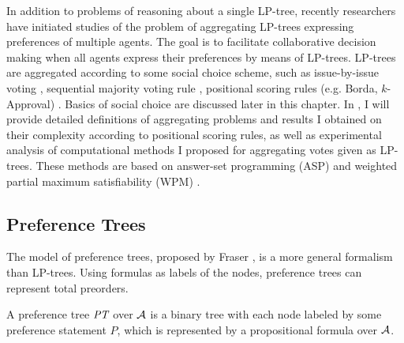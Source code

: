 %
%	  
%	

In addition to problems of reasoning about a single
LP-tree, recently researchers have initiated studies of
the problem of aggregating LP-trees expressing preferences of multiple
agents. The goal is to facilitate collaborative decision making
when all agents express their preferences by means of LP-trees.
LP-trees are aggregated
according to some social choice scheme, such as
issue-by-issue voting \cite{fargier:ibi},
sequential majority voting rule \cite{Xia:SMV},
positional scoring rules (e.g. Borda, $k$-Approval) \cite{lang,LiuT}.
Basics of social choice are discussed later in this chapter.
In , I will provide detailed definitions of aggregating
problems and results I obtained on their complexity 
according to positional scoring rules, as
well as experimental analysis 
of computational methods I proposed for aggregating votes given as
LP-trees.  These methods are based on
answer-set programming (ASP) \cite{aspataglance} and 
weighted partial maximum satisfiability (WPM) \cite{papado:b:compcomplexity}.


\subsection{Preference Trees}
The model of preference trees, proposed by Fraser \cite{fraser1993,fraser1994}, is a more
general formalism than LP-trees.
Using formulas as labels of the nodes, preference trees can represent
total preorders.

A preference tree $\textit{PT}$ over $\mathcal{A}$ is a binary tree with each node labeled by
some preference statement $P$, which is represented by a propositional
formula over $\mathcal{A}$.

